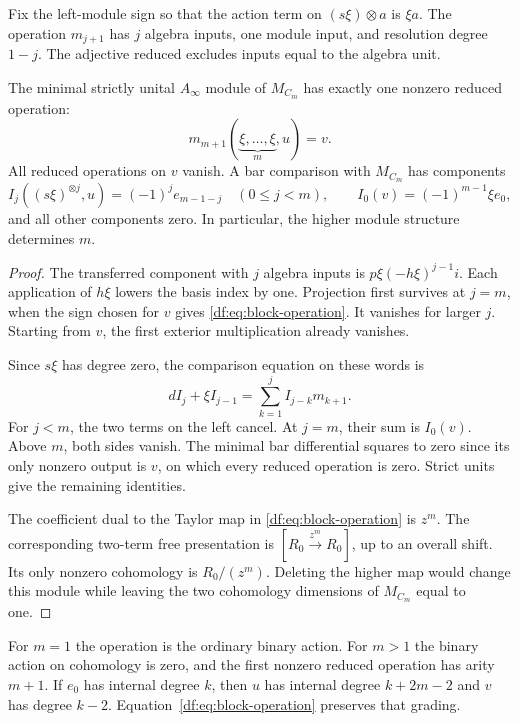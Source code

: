 Fix the left-module sign so that the action term on
$(s\xi)\otimes a$ is $\xi a$. The operation $m_{j+1}$ has $j$
algebra inputs, one module input, and resolution degree $1-j$.
The adjective reduced excludes inputs equal to the algebra unit.

\begin{theorem}\label{df:thm:block}
The minimal strictly unital $A_\infty$ module of $M_{C_m}$ has exactly
one nonzero reduced operation:
\begin{equation}\label{df:eq:block-operation}
 m_{m+1}(\underbrace{\xi,\ldots,\xi}_{m},u)=v.
\end{equation}
All reduced operations on $v$ vanish. A bar comparison with $M_{C_m}$
has components
\begin{equation}\label{df:eq:block-comparison}
 I_j((s\xi)^{\otimes j},u)=(-1)^j e_{m-1-j}\quad(0\leq j<m),
 \qquad I_0(v)=(-1)^{m-1}\xi e_0,
\end{equation}
and all other components zero. In particular, the higher module
structure determines $m$.
\end{theorem}

\begin{proof}
The transferred component with $j$ algebra inputs is
$p\xi(-h\xi)^{j-1}i$. Each application of $h\xi$ lowers the basis
index by one. Projection first survives at $j=m$, when the sign
chosen for $v$ gives \eqref{df:eq:block-operation}. It vanishes for
larger $j$. Starting from $v$, the first exterior multiplication
already vanishes.

Since $s\xi$ has degree zero, the comparison equation on these words is
\[
 dI_j+\xi I_{j-1}
       =\sum_{k=1}^j I_{j-k}m_{k+1}.
\]
For $j<m$, the two terms on the left cancel. At $j=m$, their sum
is $I_0(v)$. Above $m$, both sides vanish. The minimal bar differential
squares to zero since its only nonzero output is $v$, on which every
reduced operation is zero. Strict units give the remaining identities.

The coefficient dual to the Taylor map in
\eqref{df:eq:block-operation} is $z^m$. The corresponding two-term
free presentation is $[R_0\xrightarrow{z^m}R_0]$, up to an overall
shift. Its only nonzero cohomology is $R_0/(z^m)$. Deleting the higher
map would change this module while leaving the two cohomology
dimensions of $M_{C_m}$ equal to one.
\end{proof}

For $m=1$ the operation is the ordinary binary action. For $m>1$ the
binary action on cohomology is zero, and the first nonzero reduced
operation has arity $m+1$. If $e_0$ has internal degree $k$, then
$u$ has internal degree $k+2m-2$ and $v$ has degree $k-2$.
Equation~\eqref{df:eq:block-operation} preserves that grading.

